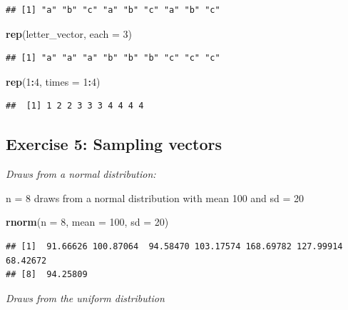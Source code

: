 \documentclass[
]{book}
\newenvironment{Shaded}{\begin{snugshade}}{\end{snugshade}}
\newcommand{\DataTypeTok}[1]{\textcolor[rgb]{0.13,0.29,0.53}{#1}}
\newcommand{\DecValTok}[1]{\textcolor[rgb]{0.00,0.00,0.81}{#1}}
\newcommand{\KeywordTok}[1]{\textcolor[rgb]{0.13,0.29,0.53}{\textbf{#1}}}
\newcommand{\NormalTok}[1]{#1}
\newcommand{\OperatorTok}[1]{\textcolor[rgb]{0.81,0.36,0.00}{\textbf{#1}}}
\begin{document}
\begin{verbatim}
## [1] "a" "b" "c" "a" "b" "c" "a" "b" "c"
\end{verbatim}

\begin{Shaded}
\begin{Highlighting}[]
\KeywordTok{rep}\NormalTok{(letter_vector, }\DataTypeTok{each =} \DecValTok{3}\NormalTok{)}
\end{Highlighting}
\end{Shaded}

\begin{verbatim}
## [1] "a" "a" "a" "b" "b" "b" "c" "c" "c"
\end{verbatim}

\begin{Shaded}
\begin{Highlighting}[]
\KeywordTok{rep}\NormalTok{(}\DecValTok{1}\OperatorTok{:}\DecValTok{4}\NormalTok{, }\DataTypeTok{times =} \DecValTok{1}\OperatorTok{:}\DecValTok{4}\NormalTok{)}
\end{Highlighting}
\end{Shaded}

\begin{verbatim}
##  [1] 1 2 2 3 3 3 4 4 4 4
\end{verbatim}

\hypertarget{exercise-5-sampling-vectors}{%
\subsection{Exercise 5: Sampling vectors}\label{exercise-5-sampling-vectors}}

\emph{Draws from a normal distribution:}

n = 8 draws from a normal distribution with mean 100 and sd = 20

\begin{Shaded}
\begin{Highlighting}[]
\KeywordTok{rnorm}\NormalTok{(}\DataTypeTok{n =} \DecValTok{8}\NormalTok{, }\DataTypeTok{mean =} \DecValTok{100}\NormalTok{, }\DataTypeTok{sd =} \DecValTok{20}\NormalTok{)}
\end{Highlighting}
\end{Shaded}

\begin{verbatim}
## [1]  91.66626 100.87064  94.58470 103.17574 168.69782 127.99914  68.42672
## [8]  94.25809
\end{verbatim}

\emph{Draws from the uniform distribution}
\end{document}

